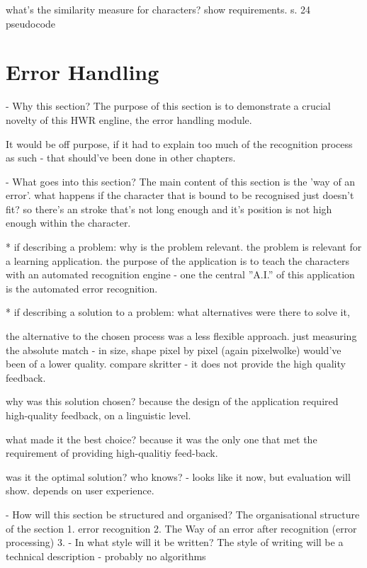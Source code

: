 what's the similarity measure for
characters?
show requirements.
s. 24 pseudocode

\section{Error Handling}
\label{sec:hwre:errorhandling}

- Why this section? 
  The purpose of this section is to demonstrate a crucial novelty of this 
  HWR engline, the error handling module.
  
  It would be off purpose, if it had to explain too much of the recognition 
  process as such - that should've been done in other chapters.
  
- What goes into this section?
  The main content of this section is the 'way of an error'.
  what happens if the character that is bound to be recognised just doesn't fit?
  so there's an stroke that's not long enough and it's position is not
  high enough within the character.

  * if describing a problem: why is the problem relevant.
    the problem is relevant for a learning application.
    the purpose of the application is to teach the characters with an automated
    recognition engine - one the central ''A.I.'' of this application
    is the automated error recognition.

  * if describing a solution to a problem: 
    what alternatives were there to solve it, 
    
    the alternative to the chosen process was a less flexible approach.
    just measuring the absolute match - in size, shape pixel by pixel
    (again pixelwolke) would've been of a lower quality.
    compare skritter - it does not provide the high quality feedback.

    why was this solution chosen? 
    because the design of the application required high-quality feedback,
    on a linguistic level.
    
    what made it the best choice? 
    because it was the only one that met the requirement of providing 
    high-qualitiy feed-back.
    
    was it the optimal solution?
    who knows? - looks like it now, but evaluation will show.
    depends on user experience. 

- How will this section be structured and organised?
  The organisational structure of the section 
   1. error recognition
   2. The Way of an error after recognition (error processing)
   3. 
- In what style will it be written?
  The style of writing will be a technical description - probably no algorithms

